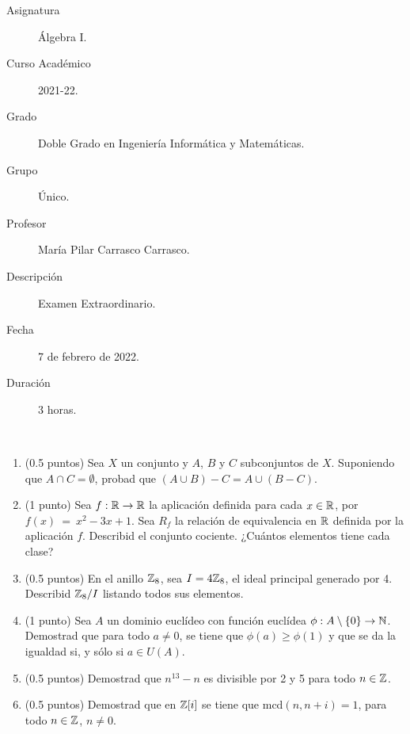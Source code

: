 \documentclass[12pt]{article}
\newcounter{ejercicio}[section] %
\newcounter{ejercicio}
\begin{document}

    
    

    
    \begin{description}
        \item[Asignatura] Álgebra I.
        \item[Curso Académico] 2021-22.
        \item[Grado] Doble Grado en Ingeniería Informática y Matemáticas.
        \item[Grupo] Único.
        \item[Profesor] María Pilar Carrasco Carrasco.
        \item[Descripción] Examen Extraordinario.
        \item[Fecha] 7 de febrero de 2022.
        \item[Duración] 3 horas.
    
    \end{description}
    \newpage
    
    \begin{ejercicio}[4 puntos]
        \ 
        \begin{enumerate} 
            \item (0.5 puntos) Sea $X$ un conjunto y $A$, $B$ y $C$ subconjuntos de $X$. Suponiendo que $A \cap C = \emptyset$, probad que $(A \cup B)-C=A\cup (B-C)$.
            \item (1 punto) Sea $f:\mathbb{R}\rightarrow \mathbb{R}$ la aplicación definida para cada $x \in \mathbb{R}$, por $f(x)~=~x^2-3x+1$. Sea $R_f$ la relación de equivalencia en $\mathbb{R}$ definida por la aplicación $f$. Describid el conjunto cociente. ¿Cuántos elementos tiene cada clase?
            \item (0.5 puntos) En el anillo $\mathbb{Z}_8$, sea $I = 4\mathbb{Z}_8$, el ideal principal generado por 4. Describid $\mathbb{Z}_8/I$ listando todos sus elementos.
            \item (1 punto) Sea $A$ un dominio euclídeo con función euclídea $\phi:A \setminus \{0\}\rightarrow \mathbb{N}$. Demostrad que para todo $a \neq 0$, se tiene que $\phi(a) \geq \phi(1)$ y que se da la igualdad si, y sólo si $a \in U(A)$.
            \item (0.5 puntos) Demostrad que $n^{13}-n$ es divisible por 2 y 5 para todo $n \in \mathbb{Z}$.
            \item (0.5 puntos) Demostrad que en $\mathbb{Z}[i]$ se tiene que mcd$(n,n+i) = 1$, para todo $n \in \mathbb{Z}$, $n \neq 0$.
        \end{enumerate} 
    \end{ejercicio}
    
\end{document}
